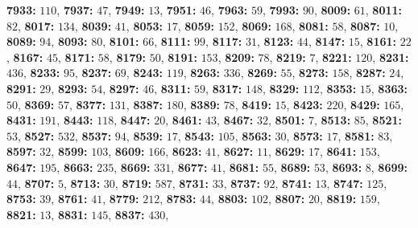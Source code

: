 \textsf{\bfseries 7933:} $110$, \textsf{\bfseries 7937:} $47$, \textsf{\bfseries 7949:} $13$, \textsf{\bfseries 7951:} $46$, \textsf{\bfseries 7963:} $59$, \textsf{\bfseries 7993:} $90$, \textsf{\bfseries 8009:} $61$, \textsf{\bfseries 8011:} $82$, \textsf{\bfseries 8017:} $134$, \textsf{\bfseries 8039:} $41$, \textsf{\bfseries 8053:} $17$, \textsf{\bfseries 8059:} $152$, \textsf{\bfseries 8069:} $168$, \textsf{\bfseries 8081:} $58$, \textsf{\bfseries 8087:} $10$, \textsf{\bfseries 8089:} $94$, \textsf{\bfseries 8093:} $80$, \textsf{\bfseries 8101:} $66$, \textsf{\bfseries 8111:} $99$, \textsf{\bfseries 8117:} $31$, \textsf{\bfseries 8123:} $44$, \textsf{\bfseries 8147:} $15$, \textsf{\bfseries 8161:} $22$, \textsf{\bfseries 8167:} $45$, \textsf{\bfseries 8171:} $58$, \textsf{\bfseries 8179:} $50$, \textsf{\bfseries 8191:} $153$, \textsf{\bfseries 8209:} $78$, \textsf{\bfseries 8219:} $7$, \textsf{\bfseries 8221:} $120$, \textsf{\bfseries 8231:} $436$, \textsf{\bfseries 8233:} $95$, \textsf{\bfseries 8237:} $69$, \textsf{\bfseries 8243:} $119$, \textsf{\bfseries 8263:} $336$, \textsf{\bfseries 8269:} $55$, \textsf{\bfseries 8273:} $158$, \textsf{\bfseries 8287:} $24$, \textsf{\bfseries 8291:} $29$, \textsf{\bfseries 8293:} $54$, \textsf{\bfseries 8297:} $46$, \textsf{\bfseries 8311:} $59$, \textsf{\bfseries 8317:} $148$, \textsf{\bfseries 8329:} $112$, \textsf{\bfseries 8353:} $15$, \textsf{\bfseries 8363:} $50$, \textsf{\bfseries 8369:} $57$, \textsf{\bfseries 8377:} $131$, \textsf{\bfseries 8387:} $180$, \textsf{\bfseries 8389:} $78$, \textsf{\bfseries 8419:} $15$, \textsf{\bfseries 8423:} $220$, \textsf{\bfseries 8429:} $165$, \textsf{\bfseries 8431:} $191$, \textsf{\bfseries 8443:} $118$, \textsf{\bfseries 8447:} $20$, \textsf{\bfseries 8461:} $43$, \textsf{\bfseries 8467:} $32$, \textsf{\bfseries 8501:} $7$, \textsf{\bfseries 8513:} $85$, \textsf{\bfseries 8521:} $53$, \textsf{\bfseries 8527:} $532$, \textsf{\bfseries 8537:} $94$, \textsf{\bfseries 8539:} $17$, \textsf{\bfseries 8543:} $105$, \textsf{\bfseries 8563:} $30$, \textsf{\bfseries 8573:} $17$, \textsf{\bfseries 8581:} $83$, \textsf{\bfseries 8597:} $32$, \textsf{\bfseries 8599:} $103$, \textsf{\bfseries 8609:} $166$, \textsf{\bfseries 8623:} $41$, \textsf{\bfseries 8627:} $11$, \textsf{\bfseries 8629:} $17$, \textsf{\bfseries 8641:} $153$, \textsf{\bfseries 8647:} $195$, \textsf{\bfseries 8663:} $235$, \textsf{\bfseries 8669:} $331$, \textsf{\bfseries 8677:} $41$, \textsf{\bfseries 8681:} $55$, \textsf{\bfseries 8689:} $53$, \textsf{\bfseries 8693:} $8$, \textsf{\bfseries 8699:} $44$, \textsf{\bfseries 8707:} $5$, \textsf{\bfseries 8713:} $30$, \textsf{\bfseries 8719:} $587$, \textsf{\bfseries 8731:} $33$, \textsf{\bfseries 8737:} $92$, \textsf{\bfseries 8741:} $13$, \textsf{\bfseries 8747:} $125$, \textsf{\bfseries 8753:} $39$, \textsf{\bfseries 8761:} $41$, \textsf{\bfseries 8779:} $212$, \textsf{\bfseries 8783:} $44$, \textsf{\bfseries 8803:} $102$, \textsf{\bfseries 8807:} $20$, \textsf{\bfseries 8819:} $159$, \textsf{\bfseries 8821:} $13$, \textsf{\bfseries 8831:} $145$, \textsf{\bfseries 8837:} $430$, 
